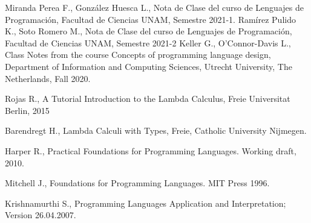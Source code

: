 \documentclass[12pt]{extarticle}
\begin{document}
\begin{thebibliography}{9}

Miranda Perea F., González Huesca L., Nota de Clase del curso de Lenguajes de Programación, Facultad de Ciencias UNAM, Semestre 2021-1.
Ramírez Pulido K., Soto Romero M., Nota de Clase del curso de Lenguajes de Programación, Facultad de Ciencias UNAM, Semestre 2021-2
Keller G., O'Connor-Davis L., Class Notes from the course Concepts of programming language design, Department of Information and Computing Sciences, Utrecht University, The Netherlands, Fall 2020.

Rojas R., A Tutorial Introduction to the Lambda
Calculus, Freie Universitat Berlin, 2015

Barendregt H., Lambda Calculi with Types, Freie, Catholic University Nijmegen.

Harper R., Practical Foundations for Programming Languages. Working draft, 2010.

Mitchell J., Foundations for Programming Languages. MIT Press 1996.

Krishnamurthi S., Programming Languages Application and Interpretation; Version 26.04.2007.


\end{thebibliography}
\end{document}
